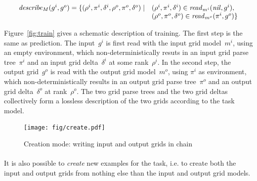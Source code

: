 \documentclass[a4paper]{llncs}
\newcommand{\HIDE}[1]{}
\begin{document}
\HIDE{ On output grids~$y_k$, we use parsing rather than
  generating. This is explained by the fact that description lengths
  are used at the learning stage rather than at the application
  stage. During learning, output models are incomplete, and still
  require some parameters and delta to generate the output
  grid~$y_k$. However, this output grid is available during learning
  (for train examples), and using parsing enables to find which
  parameters and delta are required. The objective of learning is to
  make those output parameters and delta become empty. Knowing what
  are the required parameters and delta can help the learner improve
  the model in this direction.}


\[\begin{array}{rl}
    {\it describe}_M(g^i,g^o) = \{ (\rho^i,\pi^i,\delta^i,\rho^o,\pi^o,\delta^o) \mid & (\rho^i,\pi^i,\delta^i) \in {\it read}_{m^i}({\it nil},g^i),\\
                                                                     & (\rho^o,\pi^o,\delta^o) \in {\it read}_{m^o}(\pi^i,g^o) \}
  \end{array}\]

Figure~\ref{fig:train} gives a schematic description of training. The
first step is the same as prediction. The input~$g^i$ is first read
with the input grid model~$m^i$, using an empty environment, which
non-deterministically resuts in an input grid parse tree~$\pi^i$ and
an input grid delta~$\delta^i$ at some rank~$\rho^i$. In the second
step, the output grid~$g^o$ is read with the output grid model~$m^o$,
using $\pi^i$ as environment, which non-deterministically results in
an output grid parse tree~$\pi^o$ and an output grid delta~$\delta^o$
at rank~$\rho^o$.
%
The two grid parse trees and the two grid deltas collectively form a
lossless description of the two grids according to the task model.


\begin{figure}[t]
  \centering
  \texttt{[image: fig/create.pdf]}
  \caption{Creation mode: writing input and output grids in chain}
  \label{fig:create}
\end{figure}

\paragraph{}
It is also possible to {\em create} new examples for the task, i.e. to
create both the input and output grids from nothing else than the
input and output grid models.
\end{document}

